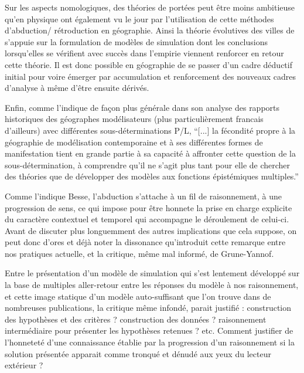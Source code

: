 Sur les aspects nomologiques, des théories de portées peut être moins ambitieuse qu'en physique ont également vu le jour par l'utilisation de cette méthodes d'abduction/ rétroduction en géographie. Ainsi la théorie évolutives des villes de \textcite{Pumain1997} s'appuie sur la formulation de modèles de simulation dont les conclusions lorsqu'elles se vérifient avec succès dans l'empirie viennent renforcer en retour cette théorie. Il est donc possible en géographie de se passer d'un cadre déductif initial pour voire émerger par accumulation et renforcement des nouveaux cadres d'analyse à même d'être ensuite dérivés. 

Enfin, comme l'indique de façon plus générale \textcite{Varenne2014} dans son analyse des rapports historiques des géographes modélisateurs (plus particulièrement francais d'ailleurs) avec différentes sous-déterminations P/L, \enquote{[...] la fécondité propre à la géographie de modélisation contemporaine et à ses différentes formes de manifestation tient en grande partie à sa capacité à affronter cette question de la sous-détermination, à comprendre qu’il ne s’agit plus tant pour elle de chercher des théories que de développer des modèles aux fonctions épistémiques multiples.}


Comme l'indique Besse, l'abduction s'attache à un fil de raisonnement, à une progression de sens, ce qui impose pour être honnete la prise en charge explicite du caractère contextuel et temporel qui accompagne le déroulement de celui-ci. Avant de discuter plus longuemment des autres implications que cela suppose, on peut donc d'ores et déjà noter la dissonance qu'introduit cette remarque entre nos pratiques actuelle, et la critique, même mal informé, de Grune-Yannof. 

Entre le présentation d'un modèle de simulation qui s'est lentement développé sur la base de multiples aller-retour entre les réponses du modèle à nos raisonnement, et cette image statique d'un modèle auto-suffisant que l'on trouve dans de nombreuses publications, la critique même infondé, parait justifié : construction des hypothèses et des critères ? construction des données ? raisonnement intermédiaire pour présenter les hypothèses retenues ? etc. Comment justifier de l'honneteté d'une connaissance établie par la progression d'un raisonnement si la solution présentée apparait comme tronqué et dénudé aux yeux du lecteur extérieur ? \autocite{OSullivan2004}

